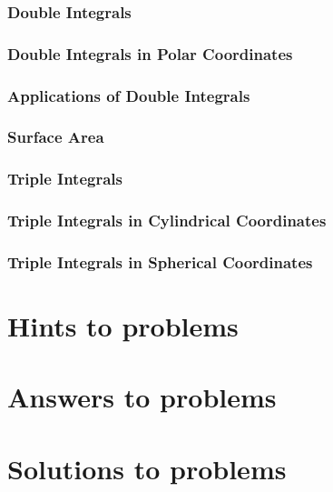 \documentclass[12pt,a4paper, openany]{book}
\begin{document}
\section{Double Integrals}

\section{Double Integrals in Polar Coordinates}

\section{Applications of Double Integrals}

\section{Surface Area}

\section{Triple Integrals}

\section{Triple Integrals in Cylindrical Coordinates}

\section{Triple Integrals in Spherical Coordinates}

%





\newpage
\part{Hints to problems}


\newpage
\part{Answers to problems}


\newpage
\part{Solutions to problems}

\end{document}
